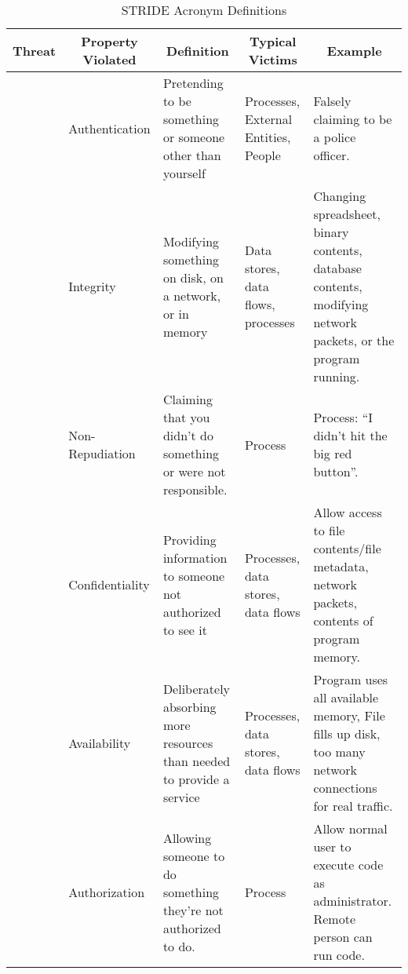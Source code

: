 \begin{table}[h!]
  \centering
  \begin{tabular}{p{1.5cm}p{2.75cm}p{4cm}p{4cm}p{4cm}}
    \toprule
    \multicolumn{1}{c}{Threat} & \multicolumn{1}{c}{Property Violated} & \multicolumn{1}{c}{Definition} & \multicolumn{1}{c}{Typical Victims} & \multicolumn{1}{c}{Example} \\
    \midrule
    \nameref{def:Spoofing} & Authentication & Pretending to be something or someone other than yourself & Processes, External Entities, People & Falsely claiming to be a police officer. \\ \midrule
    \nameref{def:Tampering} & Integrity & Modifying something on disk, on a network, or in memory & Data stores, data flows, processes & Changing spreadsheet, binary contents, database contents, modifying network packets, or the program running. \\ \midrule
    \nameref{def:Repudiation} & Non-Repudiation & Claiming that you didn't do something or were not responsible. & Process & Process: ``I didn't hit the big red button''. \\ \midrule
    \nameref{def:Information_Disclosure} & Confidentiality & Providing information to someone not authorized to see it & Processes, data stores, data flows & Allow access to file contents/file metadata, network packets, contents of program memory. \\ \midrule
    \nameref{def:Denial_of_Service} & Availability & Deliberately absorbing more resources than needed to provide a service & Processes, data stores, data flows & Program uses all available memory, File fills up disk, too many network connections for real traffic. \\ \midrule
    \nameref{def:Elevation_of_Privilege} & Authorization & Allowing someone to do something they're not authorized to do. & Process & Allow normal user to execute code as administrator. Remote person can run code. \\
    \bottomrule
  \end{tabular}
  \caption{STRIDE Acronym Definitions}
  \label{tab:STRIDE_Analysis_Definitions}
\end{table}

